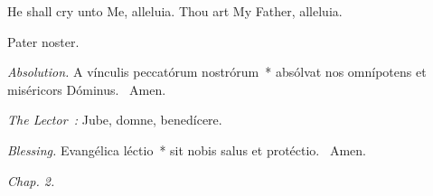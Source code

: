 {

  {
    \def\preant{\setgrefactor{17}\large}
    \def\prepsalm{\normalsize}
    \def\anttranslation{He shall cry unto Me, alleluia, Thou art My Father, alleluia.}
  }

  {
    \def\preant{\setgrefactor{17}\large}
    \def\prepsalm{\normalsize}
    \def\anttranslation{Let the heavens rejoice, and let the earth be glad before the Lord, for He cometh.}
  }

  {
    \def\preant{\setgrefactor{17}\large}
    \def\prepsalm{\normalsize}
    \def\anttranslation{The Lord hath made known, alleluia, His salvation, alleluia.}
  }

  \bigskip
  {
    {He shall cry unto Me, alleluia.}
    {Thou art My Father, alleluia.}
  }

  {
    {Pater noster.}
    \medskip{}

    \emph{Absolution.} A vínculis peccatórum nostrórum~* absólvat nos omnípotens et miséricors Dóminus. \Rbar{}~Amen.

    \emph{The Lector~:} Jube, domne, benedícere.

    \emph{Blessing.} Evangélica léctio~* sit nobis salus et protéctio. \Rbar{}~Amen.
  }

  \bigskip{}
  {


  }

  {
    \hspace{10ex}{Lesson VII.}\hfill\emph{Chap. 2.}\hspace{10ex}

    \begin{parcolumns}[rulebetween,colwidths={1=.51\linewidth}]{2}
\end{parcolumns}}}

